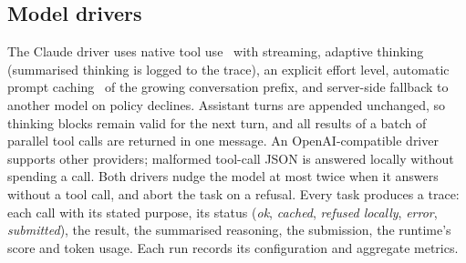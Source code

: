 \subsection{Model drivers}
\label{sec:drivers}
The Claude driver uses native tool use~\cite{anthropic_tooluse} with streaming, adaptive thinking (summarised
thinking is logged to the trace), an explicit effort level, automatic prompt caching~\cite{anthropic_promptcaching}
of the growing conversation prefix, and server-side fallback to another model on policy declines. Assistant turns are appended unchanged, so thinking blocks remain
valid for the next turn, and all results of a batch of parallel tool calls are returned in one message. An
OpenAI-compatible driver supports other providers; malformed tool-call JSON is answered locally without
spending a call. Both drivers nudge the model at most twice when it answers without a tool call, and abort the
task on a refusal. Every task produces a trace: each call with its stated purpose, its status
(\emph{ok}, \emph{cached}, \emph{refused locally}, \emph{error}, \emph{submitted}), the result, the summarised
reasoning, the submission, the runtime's score and token usage. Each run records its configuration and
aggregate metrics.
